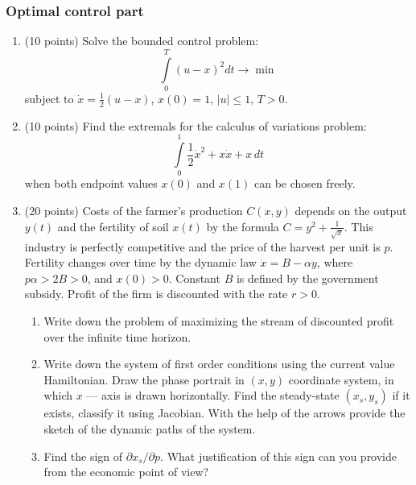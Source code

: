 \documentclass[12pt, a4paper]{article}
\begin{document}


\subsubsection*{Optimal control part}

\begin{enumerate}[resume]

\item (10 points) Solve the bounded control problem:
\[
\int\limits_0^T {{{(u - x)}^2}dt \to \min }
\]
subject to $\dot x = \frac{1}{2}(u - x)$, $x(0) = 1$, $\left| u \right| \leqslant 1$, $T > 0$.

\item (10 points) Find the extremals for the calculus of variations problem:
\[
\int\limits_0^1 \frac{1}{2}{{\dot x}^2} + x\dot x + x \, dt
\]
when both endpoint values $x(0)$ and $x(1)$ can be chosen freely.


\item (20 points) Costs of the farmer’s production $C(x,y)$ depends on the output $y(t)$ and the fertility of soil $x(t)$ by the formula $C = {y^2} + \frac{1}{{\sqrt x }}$. This industry is perfectly competitive and the price of the harvest per unit is $p$. Fertility changes over time by the dynamic law $\dot x = B - \alpha y$, where $p\alpha  > 2B > 0$, and $x(0) > 0$. Constant $B$ is defined by the government subsidy. Profit of the firm is discounted with the rate $r > 0$.

\begin{enumerate}
\item Write down the problem of maximizing the stream of discounted profit over the infinite time horizon.
\item Write down the system of first order conditions using the current value Hamiltonian.  Draw the phase portrait in $(x,y)$ coordinate system, in which $x$ — axis is drawn horizontally. Find the steady-state $(x_s, y_s)$ if it exists, classify it using Jacobian. With the help of the arrows provide the sketch of the dynamic paths of the system.
\item Find the sign of $\partial x_s / \partial p$. What justification of this sign can you provide from the economic point of view?
\end{enumerate}



\end{enumerate}
\end{document}
